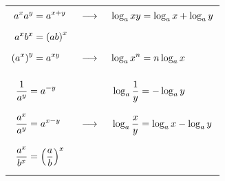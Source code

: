 \begin{multicols}{2}
{\begin{center}
\begin{tabularx}{\textwidth}{Ccc}
            $\W
                        \begin{aligned}
                            \X a^x a^y         &= a^{x+y} \\
                            \X a^x b^x         &= \parens*{ab}^x \\
                            \X \parens*{a^x}^y &= a^{xy} \\
                        \end{aligned}
            $
                &
                    $\W
                        \begin{gathered}
                            \X \longrightarrow \\
                            \X \\
                            \X \longrightarrow
                        \end{gathered}
                    $
                &
                    $\W
                        \begin{aligned}
                            \X \log_a{xy} &= \log_a{x} + \log_a{y} \\
                            \X & \\
                            \X \log_a{x^n} &= n \log_a{x}
                        \end{aligned}
                    $
                \\

            && %
                \\ %

            $\W
                        \begin{aligned}
                            \Z \frac{1}{a^y}   &= a^{-y} \\
                            \Z \frac{a^x}{a^y} &= a^{x-y} \\
                            \Z \frac{a^x}{b^x} &= \parens*{\frac{a}{b}}^x
                        \end{aligned}
            $
                &
                    $\W
                        \begin{gathered}
                            \Z \\
                            \Z \longrightarrow \\
                            \Z
                        \end{gathered}
                    $
                &
                    $\W
                        \begin{aligned}
                            \Z \log_a{\frac{1}{y}} &= -\log_a{y} \\
                            \Z \log_a{\frac{x}{y}} &= \log_a{x} - \log_a{y} \\
                            \Z &
                        \end{aligned}
                    $
                \\


\end{tabularx}
\end{center}}
\end{multicols}
